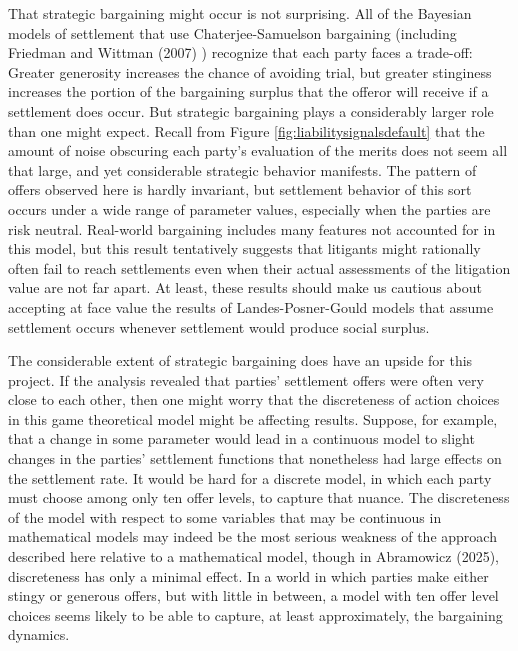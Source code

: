 \documentclass{article}
\begin{document}
That strategic bargaining might occur is not surprising. All of the Bayesian models of settlement that use Chaterjee-Samuelson bargaining (including Friedman and Wittman (2007) \cite{friedmanwittman}) recognize that each party faces a trade-off: Greater generosity increases the chance of avoiding trial, but greater stinginess increases the portion of the bargaining surplus that the offeror will receive if a settlement does occur. But strategic bargaining plays a considerably larger role than one might expect. Recall from Figure \ref{fig:liabilitysignalsdefault} that the amount of noise obscuring each party's evaluation of the merits does not seem all that large, and yet considerable strategic behavior manifests. The pattern of offers observed here is hardly invariant, but settlement behavior of this sort occurs under a wide range of parameter values, especially when the parties are risk neutral. Real-world bargaining includes many features not accounted for in this model, but this result tentatively suggests that litigants might rationally often fail to reach settlements even when their actual assessments of the litigation value are not far apart. At least, these results should make us cautious about accepting at face value the results of Landes-Posner-Gould models that assume settlement occurs whenever settlement would produce social surplus.

The considerable extent of strategic bargaining does have an upside for this project. If the analysis revealed that parties' settlement offers were often very close to each other, then one might worry that the discreteness of action choices in this game theoretical model might be affecting results. Suppose, for example, that a change in some parameter would lead in a continuous model to slight changes in the parties' settlement functions that nonetheless had large effects on the settlement rate. It would be hard for a discrete model, in which each party must choose among only ten offer levels, to capture that nuance. The discreteness of the model with respect to some variables that may be continuous in mathematical models may indeed be the most serious weakness of the approach described here relative to a mathematical model, though in Abramowicz (2025), discreteness has only a minimal effect. In a world in which parties make either stingy or generous offers, but with little in between, a model with ten offer level choices seems likely to be able to capture, at least approximately, the bargaining dynamics. 
\end{document}
